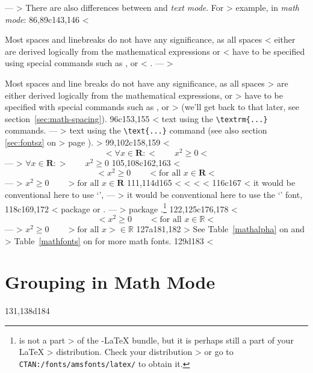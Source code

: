 ---
> There are also differences between \emph{} and \emph{text mode}. For
> example, in \emph{math mode}: 
86,89c143,146
< \item Most spaces and linebreaks do not have any significance, as all spaces
< either are derived logically from the mathematical expressions or
< have to be specified using special commands such as \ci{,},  or
< .
---
> \item {} Most spaces and line breaks do not have any significance, as all spaces
> are either derived logically from the mathematical expressions, or
> have to be specified with special commands such as \ci{,},  or
>  (we'll get back to that later, see section~\ref{sec:math-spacing}).
96c153,155
< text using the \verb|\textrm{...}| commands.
---
> text using the \verb|\text{...}| command (see also section \ref{sec:fontsz} on
> page \pageref{sec:fontsz}).
> 
99,102c158,159
< \begin{equation}
< \forall x \in \mathbf{R}:
< \qquad x^{2} \geq 0
< \end{equation}
---
> $\forall x \in \mathbf{R}:
>  \qquad x^{2} \geq 0$
105,108c162,163
< \begin{equation}
< x^{2} \geq 0\qquad
< \textrm{for all }x\in\mathbf{R}
< \end{equation}
---
> $x^{2} \geq 0\qquad
>  \text{for all }x\in\mathbf{R}$
111,114d165
< 
< %
< %
< %
116c167
< it would be conventional here to use `',
---
> it would be conventional here to use the `' font,
118c169,172
< package  or .
---
> package .\footnote{ is not a part
>   of the \AmS-\LaTeX{} bundle, but it is perhaps still a part of your \LaTeX{}
>   distribution. Check your distribution
>   or go to \texttt{CTAN:/fonts/amsfonts/latex/} to obtain it.}
122,125c176,178
< \begin{displaymath}
< x^{2} \geq 0\qquad
< \textrm{for all }x\in\mathbb{R}
< \end{displaymath}
---
> $x^{2} \geq 0\qquad
>  \text{for all } x 
>  \in \mathbb{R}$
127a181,182
> See Table~\ref{mathalpha} on \pageref{mathalpha} and
> Table~\ref{mathfonts} on \pageref{mathfonts} for more math fonts.
129d183
< \section{Grouping in Math Mode}
131,138d184
